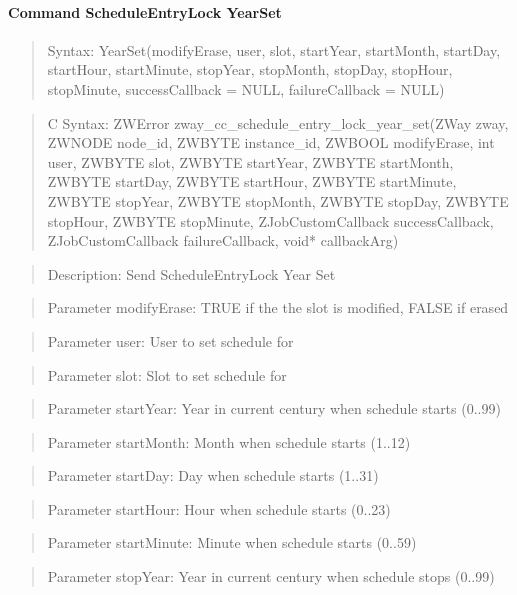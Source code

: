 \paragraph{Command ScheduleEntryLock YearSet}
\begin{quote}Syntax: YearSet(modifyErase, user, slot, startYear, startMonth, startDay, startHour, startMinute, stopYear, stopMonth, stopDay, stopHour, stopMinute, successCallback = NULL, failureCallback = NULL)\end{quote}
\begin{quote}C Syntax: ZWError zway\_cc\_schedule\_entry\_lock\_year\_set(ZWay zway, ZWNODE node\_id, ZWBYTE instance\_id, ZWBOOL modifyErase, int user, ZWBYTE slot, ZWBYTE startYear, ZWBYTE startMonth, ZWBYTE startDay, ZWBYTE startHour, ZWBYTE startMinute, ZWBYTE stopYear, ZWBYTE stopMonth, ZWBYTE stopDay, ZWBYTE stopHour, ZWBYTE stopMinute, ZJobCustomCallback successCallback, ZJobCustomCallback failureCallback, void* callbackArg)\end{quote}
\begin{quote}Description: Send ScheduleEntryLock Year Set\end{quote}
\begin{quote}Parameter modifyErase: TRUE if the the slot is modified, FALSE if erased\end{quote}
\begin{quote}Parameter user: User to set schedule for\end{quote}
\begin{quote}Parameter slot: Slot to set schedule for\end{quote}
\begin{quote}Parameter startYear: Year in current century when schedule starts (0..99)\end{quote}
\begin{quote}Parameter startMonth: Month when schedule starts (1..12)\end{quote}
\begin{quote}Parameter startDay: Day when schedule starts (1..31)\end{quote}
\begin{quote}Parameter startHour: Hour when schedule starts (0..23)\end{quote}
\begin{quote}Parameter startMinute: Minute when schedule starts (0..59)\end{quote}
\begin{quote}Parameter stopYear: Year in current century when schedule stops (0..99)\end{quote}
